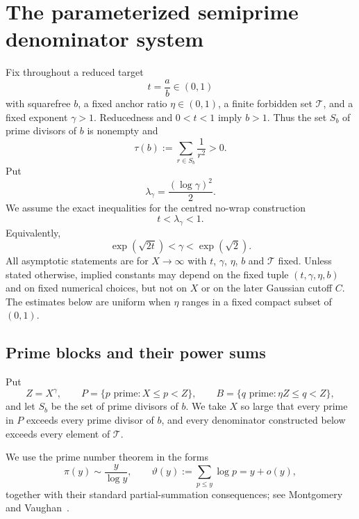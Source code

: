 \section{The parameterized semiprime denominator system}
\label{sec:denominator-system}

Fix throughout a reduced target
\[
 t=\frac ab\in(0,1)
\]
with squarefree $b$, a fixed anchor ratio $\eta\in(0,1)$, a finite forbidden set $\mathcal T$, and a fixed exponent $\gamma>1$.  Reducedness and $0<t<1$ imply $b>1$.  Thus the set $S_b$ of prime divisors of $b$ is nonempty and
\begin{equation}
\label{eq:tau-positive}
 \tau(b):=\sum_{r\in S_b}\frac1{r^2}>0.
\end{equation}
Put
\begin{equation}
\label{eq:lambda-gamma}
 \lambda_\gamma=\frac{(\log\gamma)^2}{2}.
\end{equation}
We assume the exact inequalities for the centred no-wrap construction
\begin{equation}
\label{eq:admissible-region}
 t<\lambda_\gamma<1.
\end{equation}
Equivalently,
\begin{equation}
\label{eq:admissible-gamma}
 \exp(\sqrt{2t})<\gamma<\exp(\sqrt2).
\end{equation}
All asymptotic statements are for $X\to\infty$ with $t$, $\gamma$, $\eta$, $b$ and $\mathcal T$ fixed.  Unless stated otherwise, implied constants may depend on the fixed tuple $(t,\gamma,\eta,b)$ and on fixed numerical choices, but not on $X$ or on the later Gaussian cutoff $C$.  The estimates below are uniform when $\eta$ ranges in a fixed compact subset of $(0,1)$.

\subsection{Prime blocks and their power sums}

Put
\begin{equation}
\label{eq:prime-blocks}
 Z=X^\gamma,
 \qquad
 P=\{p\text{ prime}:X\leq p<Z\},
 \qquad
 B=\{q\text{ prime}:\eta Z\leq q<Z\},
\end{equation}
and let $S_b$ be the set of prime divisors of $b$.  We take $X$ so large that every prime in $P$ exceeds every prime divisor of $b$, and every denominator constructed below exceeds every element of $\mathcal T$.

We use the prime number theorem in the forms
\[
 \pi(y)\sim\frac{y}{\log y},
 \qquad
 \vartheta(y):=\sum_{p\leq y}\log p=y+o(y),
\]
together with their standard partial-summation consequences; see Montgomery and Vaughan~\cite[Chapter~1]{montgomery-vaughan-2007}.

